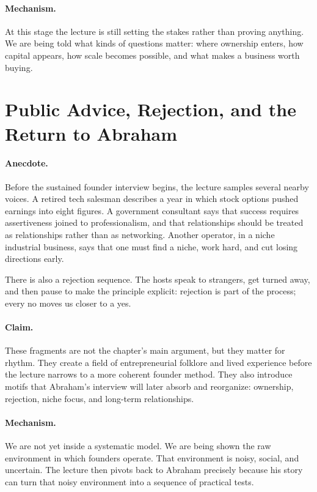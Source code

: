 \paragraph{Mechanism.} At this stage the lecture is still setting the stakes rather than proving anything. We are being told what kinds of questions matter: where ownership enters, how capital appears, how scale becomes possible, and what makes a business worth buying.

\section{Public Advice, Rejection, and the Return to Abraham}

\paragraph{Anecdote.} Before the sustained founder interview begins, the lecture samples several nearby voices. A retired tech salesman describes a year in which stock options pushed earnings into eight figures. A government consultant says that success requires assertiveness joined to professionalism, and that relationships should be treated as relationships rather than as networking. Another operator, in a niche industrial business, says that one must find a niche, work hard, and cut losing directions early.

There is also a rejection sequence. The hosts speak to strangers, get turned away, and then pause to make the principle explicit: rejection is part of the process; every no moves us closer to a yes.

\paragraph{Claim.} These fragments are not the chapter's main argument, but they matter for rhythm. They create a field of entrepreneurial folklore and lived experience before the lecture narrows to a more coherent founder method. They also introduce motifs that Abraham's interview will later absorb and reorganize: ownership, rejection, niche focus, and long-term relationships.

\paragraph{Mechanism.} We are not yet inside a systematic model. We are being shown the raw environment in which founders operate. That environment is noisy, social, and uncertain. The lecture then pivots back to Abraham precisely because his story can turn that noisy environment into a sequence of practical tests.

